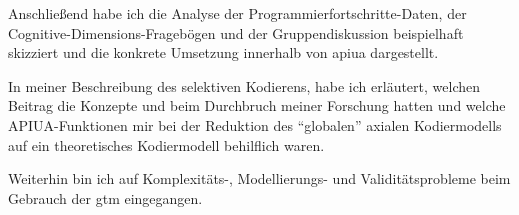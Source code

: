 Anschließend habe ich die Analyse der Programmierfortschritte-Daten, der Cognitive-Dimensions-Fragebögen und der Gruppendiskussion beispielhaft skizziert und die konkrete Umsetzung innerhalb von \gls{apiua} dargestellt.

In meiner Beschreibung des selektiven Kodierens, habe ich erläutert, welchen Beitrag die Konzepte  und  beim Durchbruch meiner Forschung hatten und welche APIUA-Funktionen mir bei der Reduktion des ``globalen'' axialen Kodiermodells auf ein theoretisches Kodiermodell behilflich waren.

Weiterhin bin ich auf Komplexitäts-, Modellierungs- und Validitätsprobleme beim Gebrauch der \gls{gtm} eingegangen.%